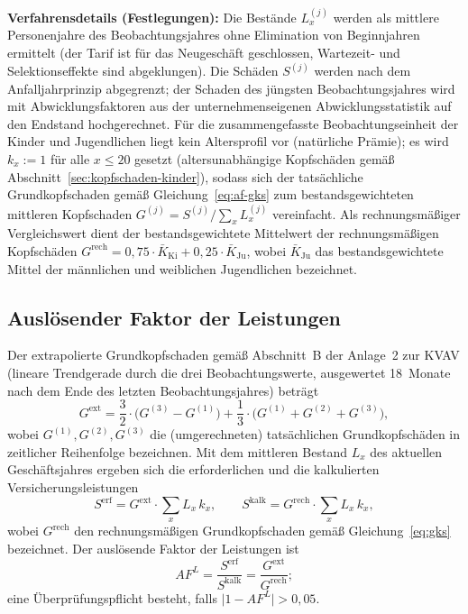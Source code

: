 \textbf{Verfahrensdetails (Festlegungen):} Die Bestände $L^{(j)}_x$
werden als mittlere Personenjahre des Beobachtungsjahres ohne
Elimination von Beginnjahren ermittelt (der Tarif ist für das
Neugeschäft geschlossen, Wartezeit- und Selektionseffekte sind
abgeklungen). Die Schäden $S^{(j)}$ werden nach dem Anfalljahrprinzip
abgegrenzt; der Schaden des jüngsten Beobachtungsjahres wird mit
Abwicklungsfaktoren aus der unternehmenseigenen
Abwicklungsstatistik auf den Endstand hochgerechnet. Für die
zusammengefasste Beobachtungseinheit der Kinder und Jugendlichen liegt
kein Altersprofil vor (natürliche Prämie); es wird $k_x := 1$ für alle
$x \le 20$ gesetzt (altersunabhängige Kopfschäden gemäß
Abschnitt~\ref{sec:kopfschaden-kinder}), sodass sich der tatsächliche
Grundkopfschaden gemäß Gleichung~\eqref{eq:af-gks} zum
bestandsgewichteten mittleren Kopfschaden
$G^{(j)} = S^{(j)} / \sum_x L^{(j)}_x$ vereinfacht. Als rechnungsmäßiger
Vergleichswert dient der bestandsgewichtete Mittelwert der
rechnungsmäßigen Kopfschäden
$G^{\mathrm{rech}} = 0{,}75\cdot\bar{K}_{\mathrm{Ki}}
+ 0{,}25\cdot\bar{K}_{\mathrm{Ju}}$, wobei $\bar{K}_{\mathrm{Ju}}$ das
bestandsgewichtete Mittel der männlichen und weiblichen Jugendlichen
bezeichnet.

\subsection{Auslösender Faktor der Leistungen}\label{sec:af-leistung}

Der extrapolierte Grundkopfschaden gemäß Abschnitt~B der Anlage~2 zur
KVAV (lineare Trendgerade durch die drei Beobachtungswerte,
ausgewertet 18~Monate nach dem Ende des letzten Beobachtungsjahres)
beträgt
\begin{equation}
G^{\mathrm{ext}} = \frac{3}{2}\cdot\bigl(G^{(3)} - G^{(1)}\bigr)
+ \frac{1}{3}\cdot\bigl(G^{(1)} + G^{(2)} + G^{(3)}\bigr),
\label{eq:af-ext}
\end{equation}
wobei $G^{(1)}, G^{(2)}, G^{(3)}$ die (umgerechneten) tatsächlichen
Grundkopfschäden in zeitlicher Reihenfolge bezeichnen. Mit dem
mittleren Bestand $L_x$ des aktuellen Geschäftsjahres ergeben sich die
erforderlichen und die kalkulierten Versicherungsleistungen
\begin{equation}
S^{\mathrm{erf}} = G^{\mathrm{ext}}\cdot\sum_x L_x\,k_x,
\qquad
S^{\mathrm{kalk}} = G^{\mathrm{rech}}\cdot\sum_x L_x\,k_x,
\label
{eq:af-serf}
\end{equation}
wobei $G^{\mathrm{rech}}$ den rechnungsmäßigen Grundkopfschaden gemäß
Gleichung~\eqref{eq:gks} bezeichnet. Der auslösende Faktor der
Leistungen ist
\begin{equation}
AF^{L} = \frac{S^{\mathrm{erf}}}{S^{\mathrm{kalk}}}
       = \frac{G^{\mathrm{ext}}}{G^{\mathrm{rech}}};
\label{eq:af-l}
\end{equation}
eine Überprüfungspflicht besteht, falls
$\bigl|1 - AF^{L}\bigr| > 0{,}05$.

